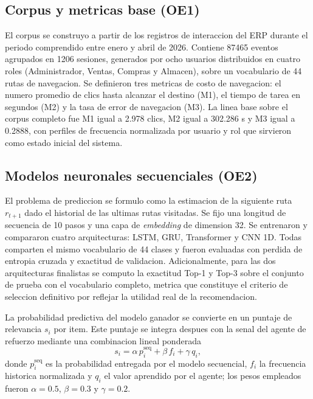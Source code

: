 \documentclass[conference]{IEEEtran}
\begin{document}
\subsection{Corpus y metricas base (OE1)}
El corpus se construyo a partir de los registros de interaccion del ERP durante el periodo comprendido entre enero y abril de 2026. Contiene 87465 eventos agrupados en 1206 sesiones, generados por ocho usuarios distribuidos en cuatro roles (Administrador, Ventas, Compras y Almacen), sobre un vocabulario de 44 rutas de navegacion. Se definieron tres metricas de costo de navegacion: el numero promedio de clics hasta alcanzar el destino (M1), el tiempo de tarea en segundos (M2) y la tasa de error de navegacion (M3). La linea base sobre el corpus completo fue M1 igual a 2.978 clics, M2 igual a 302.286 s y M3 igual a 0.2888, con perfiles de frecuencia normalizada por usuario y rol que sirvieron como estado inicial del sistema.

\subsection{Modelos neuronales secuenciales (OE2)}
El problema de prediccion se formulo como la estimacion de la siguiente ruta $r_{t+1}$ dado el historial de las ultimas rutas visitadas. Se fijo una longitud de secuencia de 10 pasos y una capa de \textit{embedding} de dimension 32. Se entrenaron y compararon cuatro arquitecturas: LSTM, GRU, Transformer y CNN 1D. Todas comparten el mismo vocabulario de 44 clases y fueron evaluadas con perdida de entropia cruzada y exactitud de validacion. Adicionalmente, para las dos arquitecturas finalistas se computo la exactitud Top-1 y Top-3 sobre el conjunto de prueba con el vocabulario completo, metrica que constituye el criterio de seleccion definitivo por reflejar la utilidad real de la recomendacion.

La probabilidad predictiva del modelo ganador se convierte en un puntaje de relevancia $s_i$ por item. Este puntaje se integra despues con la senal del agente de refuerzo mediante una combinacion lineal ponderada
\begin{equation}
s_i = \alpha\, p^{\text{seq}}_i + \beta\, f_i + \gamma\, q_i,\label{eq_score}
\end{equation}
donde $p^{\text{seq}}_i$ es la probabilidad entregada por el modelo secuencial, $f_i$ la frecuencia historica normalizada y $q_i$ el valor aprendido por el agente; los pesos empleados fueron $\alpha = 0.5$, $\beta = 0.3$ y $\gamma = 0.2$.
\end{document}
